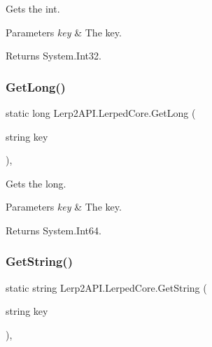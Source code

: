 Gets the int. 


\begin{DoxyParams}{Parameters}
{\em key} & The key.\\
\hline
\end{DoxyParams}
\begin{DoxyReturn}{Returns}
System.\+Int32.
\end{DoxyReturn}
\mbox{\label{class_lerp2_a_p_i_1_1_lerped_core_a8c3bf0c6dc234b2955fdc29bd780d276}} 
\subsubsection{\texorpdfstring{Get\+Long()}{GetLong()}}
{\footnotesize\ttfamily static long Lerp2\+A\+P\+I.\+Lerped\+Core.\+Get\+Long (\begin{DoxyParamCaption}\item[{string}]{key }\end{DoxyParamCaption})\hspace{0.3cm}{\ttfamily [inline]}, {\ttfamily [static]}}



Gets the long. 


\begin{DoxyParams}{Parameters}
{\em key} & The key.\\
\hline
\end{DoxyParams}
\begin{DoxyReturn}{Returns}
System.\+Int64.
\end{DoxyReturn}
\mbox{\label{class_lerp2_a_p_i_1_1_lerped_core_ab15116e8a0a077a93db066e24d737d9d}} 
\subsubsection{\texorpdfstring{Get\+String()}{GetString()}}
{\footnotesize\ttfamily static string Lerp2\+A\+P\+I.\+Lerped\+Core.\+Get\+String (\begin{DoxyParamCaption}\item[{string}]{key }\end{DoxyParamCaption})\hspace{0.3cm}{\ttfamily [inline]}, {\ttfamily [static]}}



